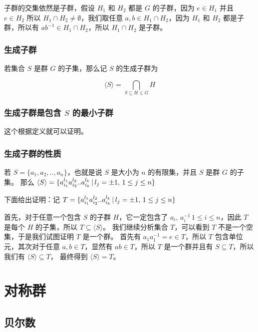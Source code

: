子群的交集依然是子群，假设 $H_1$ 和 $H_2$ 都是 $G$ 的子群，因为 $e \in H_1$ 并且 $e \in H_2$ 
所以 $H_1 \cap H_2 \ne \emptyset$，我们取任意 $a, b \in H_1 \cap H_2$，因为 $H_1$ 和 $H_2$
都是子群，所以有 $a b^{-1} \in H_1 \cap H_2$，所以 $H_1 \cap H_2$ 是子群。

\subsubsection{生成子群}

若集合 $S$ 是群 $G$ 的子集，那么记 $S$ 的生成子群为

\[
\langle S \rangle = \bigcap_{S \subseteq H \leq G} H
\]

\subsubsection{生成子群是包含 $S$ 的最小子群}

这个根据定义就可以证明。

\subsubsection{生成子群的性质}

若 $S = \{a_1, a_2, .., a_n \}$，也就是说 $S$ 是大小为 $n$ 的有限集，并且 $S$ 是群 $G$ 的子集。
那么 $\langle S \rangle = \{ a_{i_1}^{l_1} a_{i_2}^{l_2} .. a_{i_k}^{l_k} \,\vert\, l_j = \pm 1,\, 1 \le j \le n \}$

下面给出证明：记 $T = \{ a_{i_1}^{l_1} a_{i_2}^{l_2} .. a_{i_k}^{l_k} \,\vert\, l_j = \pm 1,\, 1 \le j \le n \}$

首先，对于任意一个包含 $S$ 的子群 $H$，它一定包含了 $a_i,\,a_i^{-1}\, 1 \le i \le n$，因此 $T$ 是每个 $H$ 的子集，所以 $T \subseteq \langle S \rangle $。
我们继续分析集合 $T$，可以看到 $T$ 不是一个空集，于是我们试图证明 $T$ 是一个群。
首先有 $a_1a_1^{-1} = e \in T$，所以 $T$ 包含单位元，其次对于任意 $a, b \in T$，显然有 $ab \in T$，所以 $T$ 是一个群并且有 $S \subseteq T$，所以我们有 $\langle S \rangle \subseteq T$，
最终得到 $\langle S \rangle = T$。


\section{对称群}

\subsection{贝尔数}

